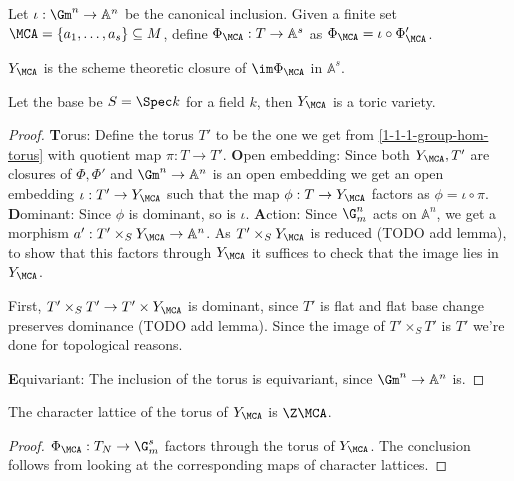 \begin{definition}
  \label{1-1-phiA}

  Let $\iota : \Gm^n \to \mathbb{A}^n$ be the canonical inclusion.
  Given a finite set $\MCA = \{a_1, \dotsc, a_s\} \subseteq M$,
  define $\Phi_\MCA : T \to \mathbb{A}^s$ as $\Phi_{\MCA}=\iota\circ\Phi'_{\MCA}$.
\end{definition}


\begin{definition}
  \label{1-1-7-ya}

  $Y_\MCA$ is the scheme theoretic closure of $\im \Phi_\MCA$ in $\mathbb A^s$.
\end{definition}


\begin{proposition}
  \label{1-1-8-aff-tor-var-ya}

  Let the base be $S=\Spec k$ for a field $k$, then $Y_\MCA$ is a toric variety.
\end{proposition}
\begin{proof}

  {\textbf Torus: }
  Define the torus $T'$ to be the one we get from \ref{1-1-1-group-hom-torus} with quotient map $\pi:T \to T'$.
  {\textbf Open embedding: }
  Since both $Y_{\MCA},T'$ are closures of $\Phi,\Phi'$ and $\Gm^n\to\mathbb{A}^n$ is an open embedding
  we get an open embedding $\iota:T' \to Y_{\MCA}$ such that the map $\phi:T \to Y_{\MCA}$ factors as
  $\phi = \iota \circ \pi$.
  {\textbf Dominant: } Since $\phi$ is dominant, so is $\iota$.
  {\textbf Action: }
  Since $\G_m^n$ acts on $\mathbb{A}^n$, we get a morphism $a':T' \times_S Y_\MCA \to \mathbb{A}^n$.
  As $T'\times_S Y_\MCA$ is reduced (TODO add lemma), to show that this factors through $Y_\MCA$ it suffices to check
  that the image lies in $Y_\MCA$.

  First, $T'\times_S T' \to T'\times Y_\MCA$ is dominant, since $T'$ is flat and flat base change preserves dominance (TODO add lemma).
  Since the image of $T'\times_S T'$ is $T'$ we're done for topological reasons.

  {\textbf Equivariant: } The inclusion of the torus is equivariant, since $\Gm^n \to \mathbb{A}^n$ is.
\end{proof}

\begin{proposition}
  \label{1-1-8-char-ya}

  The character lattice of the torus of $Y_\MCA$ is $\Z \MCA$.
\end{proposition}
\begin{proof}

  $\Phi_\MCA: T_N \to \G_m^s$ factors through the torus of $Y_\MCA$.
  The conclusion follows from looking at the corresponding maps of character lattices.
\end{proof}

